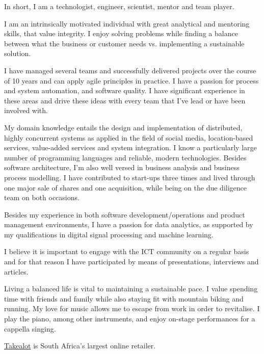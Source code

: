 \documentclass[10pt,a4paper,final]{columncv}
\begin{document}
\pagebreak



In short, I am a technologist, engineer, scientist, mentor and team player.

I am an intrinsically motivated individual with great analytical and mentoring skills, 
that value integrity. I enjoy solving problems while finding a balance between what the 
business or customer needs vs. implementing a sustainable solution. 

I have managed several teams and successfully delivered projects over the course of 10 
years and can apply agile principles in practice. I have a passion for process and system 
automation, and software quality. I have significant experience in these areas and drive 
these ideas with every team that I've lead or have been involved with. 

My domain knowledge entails the design and implementation of distributed, highly 
concurrent systems as applied in the field of social media, location-based services, 
value-added services and system integration. I know a particularly large number of 
programming languages and reliable, modern technologies. Besides software architecture, 
I'm also well versed in business analysis and business process modelling. I have 
contributed to start-ups three times and lived through one major sale of shares and one 
acquisition, while being on the due diligence team on both occasions. 

Besides my experience in both software development/operations and product management 
environments, I have a passion for data analytics, as supported by my qualifications in 
digital signal processing and machine learning. 

I believe it is important to engage with the ICT community on a regular basis and for that 
reason I have participated by means of presentations, interviews and articles. 

Living a balanced life is vital to maintaining a sustainable pace. I value spending time 
with friends and family while also staying fit with mountain biking and running. My love 
for music allows me to escape from work in order to revitalise. I play the piano, among 
other instruments, and enjoy on-stage performances for a cappella singing. 

\pagebreak

\noindent \href{http://www.takealot.com/}{Takealot} is South Africa's largest online retailer. 
\end{document}
